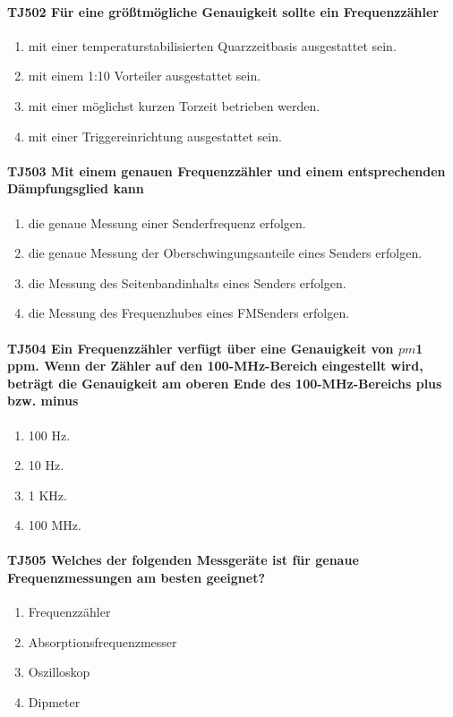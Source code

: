 \documentclass[8pt]{article}
\begin{document}
\paragraph*{TJ502 Für eine größtmögliche Genauigkeit sollte ein Frequenzzähler}
\begin{enumerate}[nolistsep,label=\Alph*]
\item mit einer temperaturstabilisierten Quarzzeitbasis ausgestattet sein.
\item mit einem 1:10 Vorteiler ausgestattet sein.
\item mit einer möglichst kurzen Torzeit betrieben werden.
\item mit einer Triggereinrichtung ausgestattet sein.
\end{enumerate}

\paragraph*{TJ503 Mit einem genauen Frequenzzähler und einem entsprechenden Dämpfungsglied kann}
\begin{enumerate}[nolistsep,label=\Alph*]
\item die genaue Messung einer Senderfrequenz erfolgen.
\item die genaue Messung der Oberschwingungsanteile eines Senders erfolgen.
\item die Messung des Seitenbandinhalts eines Senders erfolgen.
\item die Messung des Frequenzhubes eines FMSenders erfolgen.
\end{enumerate}

\paragraph*{TJ504 Ein Frequenzzähler verfügt über eine Genauigkeit von $pm$1 ppm. Wenn der Zähler auf den 100-MHz-Bereich eingestellt wird, beträgt die Genauigkeit am oberen Ende des 100-MHz-Bereichs plus bzw. minus}
\begin{enumerate}[nolistsep,label=\Alph*]
\item 100 Hz.
\item 10 Hz.
\item 1 KHz.
\item 100 MHz.
\end{enumerate}

\paragraph*{TJ505 Welches der folgenden Messgeräte ist für genaue Frequenzmessungen am besten geeignet?}
\begin{enumerate}[nolistsep,label=\Alph*]
\item Frequenzzähler
\item Absorptionsfrequenzmesser
\item Oszilloskop
\item Dipmeter
\end{enumerate}
\end{document}
